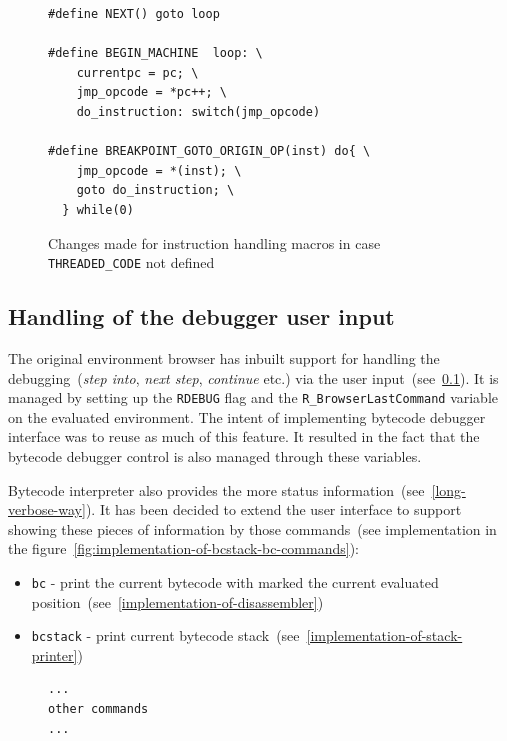\documentclass[thesis=M,english]{FITthesis}[2018/10/20]
\newcommand{\code}[1]{\texttt{#1}}
\begin{document}
{\begin{figure}[H]
\begin{lstlisting}
#define NEXT() goto loop

#define BEGIN_MACHINE  loop: \
    currentpc = pc; \
    jmp_opcode = *pc++; \
    do_instruction: switch(jmp_opcode)

#define BREAKPOINT_GOTO_ORIGIN_OP(inst) do{ \
    jmp_opcode = *(inst); \
    goto do_instruction; \
  } while(0)
\end{lstlisting}
	\caption{Changes made for instruction handling macros in case \code{THREADED{\_}CODE} not defined}\label{fig:instruction-handling-not-threaded}
\end{figure}

\subsection{Handling of the debugger user input}\label{handling-debugger-user-input}

The original environment browser has inbuilt support for handling the debugging~(\textit{step into}, \textit{next step}, \textit{continue} etc.) via the user input~(see~\ref{handling-debugger-user-input}). It is managed by setting up the \code{RDEBUG} flag and the \code{R{\_}BrowserLastCommand} variable on the evaluated environment. The intent of implementing bytecode debugger interface was to reuse as much of this feature. It resulted in the fact that the bytecode debugger control is also managed through these variables. 

Bytecode interpreter also provides the more status information~(see~\ref{long-verbose-way}). It has been decided to extend the user interface to support showing these pieces of information by those commands~(see implementation in the figure~\ref{fig:implementation-of-bcstack-bc-commands}):

\begin{itemize}
	\item \code{bc} - print the current bytecode with marked the current evaluated position~(see~\ref{implementation-of-disassembler})
	\item \code{bcstack} - print current bytecode stack~(see~\ref{implementation-of-stack-printer})
\end{itemize}

\begin{figure}[H]
\begin{lstlisting}
...
other commands
...


\end{lstlisting}
\end{figure}}
\end{document}
